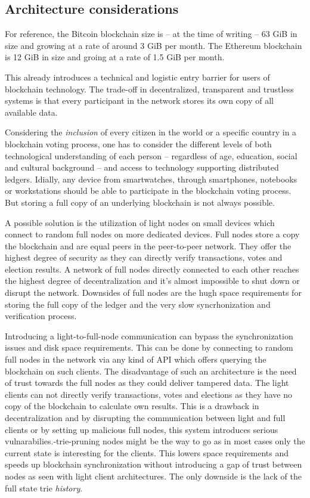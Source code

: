 \documentclass[9pt,oneside]{amsart}
\begin{document}
\begin{multicols}{2}
\subsection{Architecture considerations}
For reference, the Bitcoin blockchain size is -- at the time of writing -- 63 GiB in size and growing at a rate of around 3 GiB per month. The Ethereum blockchain is 12 GiB in size and groing at a rate of 1.5 GiB per month.\par
This already introduces a technical and logistic entry barrier for users of blockchain technology. The trade-off in decentralized, transparent and trustless systems is that every participant in the network stores its own copy of all available data.\par
Considering the \textit{inclusion} of every citizen in the world or a specific country in a blockchain voting process, one has to consider the different levels of both technological understanding of each person -- regardless of age, education, social and cultural background -- and access to technology supporting distributed ledgers. Idially, any device from smartwatches, through smartphones, notebooks or workstations should be able to participate in the blockchain voting process. But storing a full copy of an underlying blockchain is not always possible.\par
A possible solution is the utilization of light nodes on small devices which connect to random full nodes on more dedicated devices. Full nodes store a copy the blockchain and are equal peers in the peer-to-peer network. They offer the highest degree of security as they can directly verify transactions, votes and election results. A network of full nodes directly connected to each other reaches the highest degree of decentralization and it's almost impossible to shut down or disrupt the network. Downsides of full nodes are the hugh space requirements for storing the full copy of the ledger and the very slow syncrhonization and verification process.\par
Introducing a light-to-full-node communication can bypass the synchronization issues and disk space requirements. This can be done by connecting to random full nodes in the network via any kind of API which offers querying the blockchain on such clients. The disadvantage of such an architecture is the need of trust towards the full nodes as they could deliver tampered data. The light clients can not directly verify transactions, votes and elections as they have no copy of the blockchain to calculate own results. This is a drawback in decentralization and by disrupting the communication between light and full clients or by setting up malicious full nodes, this system introduces serious vulnarabilies.\parState-trie-pruning nodes might be the way to go as in most cases only the current state is interesting for the clients. This lowers space requirements and speeds up blockchain synchronization without introducing a gap of trust between nodes as seen with light client architectures. The only downside is the lack of the full state trie \textit{history}.

\end{multicols}
\end{document}
